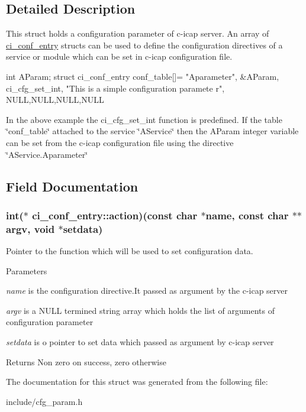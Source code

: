 \subsection{Detailed Description}
This struct holds a configuration parameter of c-\/icap server. An array of \hyperlink{structci__conf__entry}{ci\_\-conf\_\-entry} structs can be used to define the configuration directives of a service or module which can be set in c-\/icap configuration file. 
\begin{DoxyCode}
 int AParam;
 struct ci_conf_entry conf_table[]= {
 {"Aparameter", &AParam, ci_cfg_set_int, "This is a simple configuration paramete
      r"},
  {NULL,NULL,NULL,NULL}
 }
\end{DoxyCode}
 In the above example the ci\_\-cfg\_\-set\_\-int function is predefined. If the table \char`\"{}conf\_\-table\char`\"{} attached to the service \char`\"{}AService\char`\"{} then the AParam integer variable can be set from the c-\/icap configuration file using the directive \char`\"{}AService.Aparameter\char`\"{} 

\subsection{Field Documentation}
\hypertarget{structci__conf__entry_a590f0f7422f75f66b40a7e8155c3fd35}{
\subsubsection[{action}]{\setlength{\rightskip}{0pt plus 5cm}int($\ast$ {\bf ci\_\-conf\_\-entry::action})(const char $\ast${\bf name}, const char $\ast$$\ast$argv, void $\ast$setdata)}}
\label{structci__conf__entry_a590f0f7422f75f66b40a7e8155c3fd35}


Pointer to the function which will be used to set configuration data. 
\begin{DoxyParams}{Parameters}
\item[{\em name}]is the configuration directive.It passed as argument by the c-\/icap server \item[{\em argv}]is a NULL termined string array which holds the list of arguments of configuration parameter \item[{\em setdata}]is o pointer to set data which passed as argument by c-\/icap server \end{DoxyParams}
\begin{DoxyReturn}{Returns}
Non zero on success, zero otherwise 
\end{DoxyReturn}


The documentation for this struct was generated from the following file:\begin{DoxyCompactItemize}
\item 
include/cfg\_\-param.h\end{DoxyCompactItemize}
